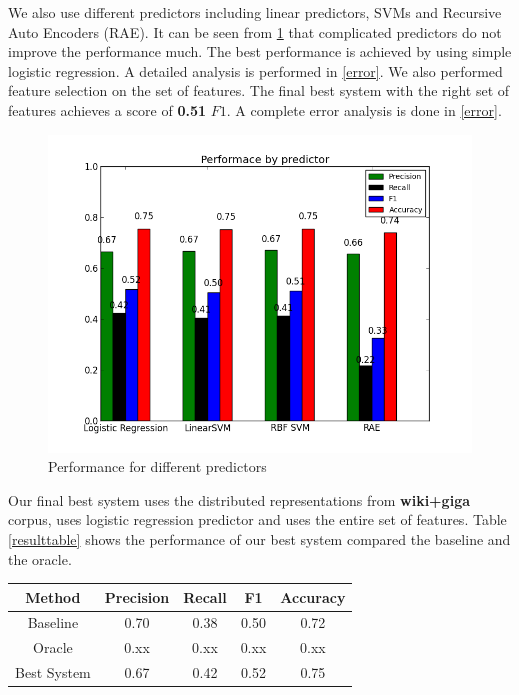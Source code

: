 \documentclass[conference]{IEEEtran}
\begin{document}
\indent We also use different predictors including linear predictors, SVMs and Recursive Auto Encoders (RAE). It can be seen from \ref{predSelect} that complicated predictors do not improve the performance much. The best performance is achieved by using simple logistic regression. A detailed analysis is performed in \ref{error}. We also performed feature selection on the set of features. The final best system with the right set of features achieves a score of \textbf{0.51} $F1$. A complete error analysis is done in \ref{error}.\\
\begin{figure}
	\centering
	\includegraphics[scale=0.4]{cmp_predictors.png}
	\caption{Performance for different predictors}
	\label{predSelect}
\end{figure}

\indent Our final best system uses the distributed representations from \textbf{wiki+giga} corpus, uses logistic regression predictor and uses the entire set of features. Table \ref{resulttable} shows the performance of our best system compared the baseline and the oracle.

\begin{center}
\label{resulttable}
\begin{tabular}{| c | c | c | c | c |}
\hline
 Method & Precision & Recall & F1 & Accuracy\\ \hline
Baseline & 0.70 & 0.38 & 0.50 & 0.72 \\ \hline
Oracle & 0.xx & 0.xx & 0.xx & 0.xx \\ \hline
Best System & 0.67 & 0.42 & 0.52 & 0.75  \\ 
\hline
\end{tabular}
\end{center}
\end{document}
